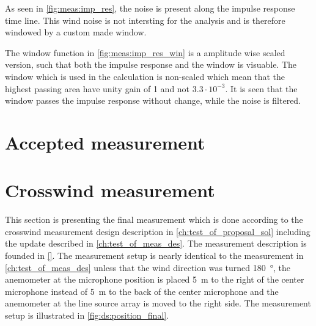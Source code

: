 

As seen in \autoref{fig:meas:imp_res}, the noise is present along the impulse response time line. This wind noise is not intersting for the analysis and is therefore windowed by a custom made window.   



The window function in \autoref{fig:meas:imp_res_win} is a amplitude wise scaled version, such that both the impulse response and the window is visuable. The window which is used in the calculation is non-scaled which mean that the highest passing area have unity gain of 1 and not $3.3 \cdot 10^{-3}$. It is seen that the window passes the impulse response without change, while the noise is filtered.


\section{Accepted measurement}



\section{Crosswind measurement}\label{mes:kudo:cross_mes}
This section is presenting the final measurement which is done according to the crosswind measurement design description in \autoref{ch:test_of_proposal_sol} including the update described in \autoref{ch:test_of_meas_des}. The measurement description is founded in \autoref{}. The measurement setup is nearly identical to the measurement in \autoref{ch:test_of_meas_des} unless that the wind direction was turned \SI{180}{\degree}, the anemometer at the microphone position is placed \SI{5}{\meter} to the right of the center microphone instead of \SI{5}{\meter} to the back of the center microphone and the anemometer at the line source array is moved to the right side. The measurement setup is illustrated in \autoref{fig:ds:position_final}.





